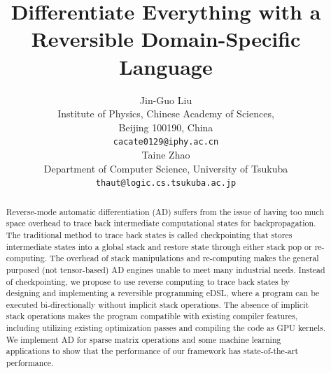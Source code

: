\documentclass{article}
\newcommand{\<}{\langle}
\renewcommand{\>}{\rangle}
\theoremstyle{definition}\newtheorem{definition}{\textit{Definition}}
\begin{document}
\title{Differentiate Everything with a Reversible Domain-Specific Language}

\author{Jin-Guo Liu\\
Institute of Physics, Chinese Academy of Sciences,\\Beijing 100190, China\\
\texttt{cacate0129@iphy.ac.cn}\\
\And
Taine Zhao\\
Department of Computer Science, University of Tsukuba\\
\texttt{thaut@logic.cs.tsukuba.ac.jp}\\
}



\maketitle

\begin{abstract}
Reverse-mode automatic differentiation (AD) suffers from the issue of having too much space overhead to trace back intermediate computational states for backpropagation.
The traditional method to trace back states is called checkpointing that stores intermediate states into a global stack and restore state through either stack pop or re-computing.
The overhead of stack manipulations and re-computing makes the general purposed (not tensor-based) AD engines unable to meet many industrial needs.
Instead of checkpointing, we propose to use reverse computing to trace back states by designing and implementing a reversible programming eDSL, where a program can be executed bi-directionally without implicit stack operations. The absence of implicit stack operations makes the program compatible with existing compiler features, including utilizing existing optimization passes and compiling the code as GPU kernels.
We implement AD for sparse matrix operations and some machine learning applications to show that the performance of our framework has state-of-the-art performance.
\end{abstract}
\end{document}
